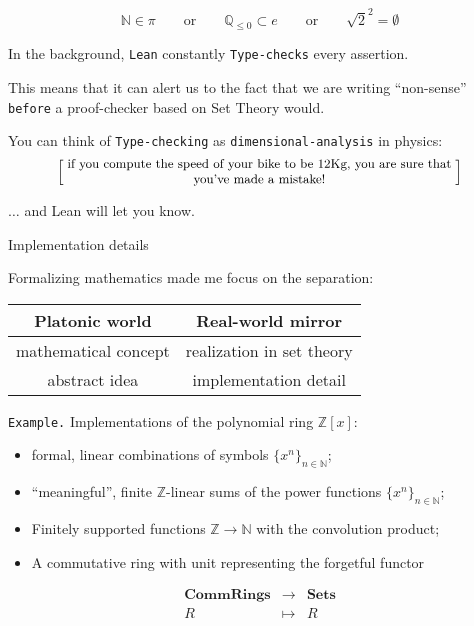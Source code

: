 \documentclass{beamer}
\begin{document}
\begin{frame}[fragile]

$$
  \mathbb{N} \in \pi
  \qquad {\textrm{or}} \qquad
  \mathbb{Q}_{\le 0} \subset e
  \qquad {\textrm{or}} \qquad
  \sqrt{2} ^ 2 = \emptyset
$$

In the background, {\color{violet}\verb`Lean`} constantly {\color{violet}\verb`Type-checks`} every assertion.

This means that it can alert us to the fact that we are writing ``non-sense'' {\color{violet}\verb`before`} a proof-checker based on Set Theory would.

You can think of {\color{violet}\verb`Type-checking`} as {\color{violet}\verb`dimensional-analysis`} in physics:
\[
  \left[ \;
  \parbox{0.8\textwidth}{\centering\small
  if you compute the speed of your bike to be $12$Kg, you are sure that you've made a mistake!
  }
  \; \right]
\]

$\ldots$ and Lean will let you know.
\end{frame}

\begin{frame}[fragile]{Implementation details}

Formalizing mathematics made me focus on the separation:

{\centering
\begin{tabular}{|c|c|}
\hline
Platonic world &  Real-world mirror \\
\hline
mathematical concept & realization in set theory \\
abstract idea        & implementation detail \\
\hline
\end{tabular}

}

{\color{violet}\verb`Example.`} Implementations of the polynomial ring $\mathbb{Z}[x]$:
\\
\vspace{-13pt}
\begin{itemize}
\setlength\itemsep{-12pt}
\item
  formal, linear combinations of symbols $\{ x^n \}_{n \in \mathbb{N}}$;
\item
  ``meaningful'', finite $\mathbb{Z}$-linear sums of the power functions $\{ x^n \}_{n \in \mathbb{N}}$;
\item
  Finitely supported functions $\mathbb{Z} \to \mathbb{N}$ with the convolution product;
\item
  A commutative ring with unit representing the forgetful functor
\end{itemize}
$$
  \begin{array}{rcl}
    {\textbf{CommRings}} & \longrightarrow & {\textbf{Sets}} \\
    R & \longmapsto & R
  \end{array}
$$
\end{frame}
\end{document}
